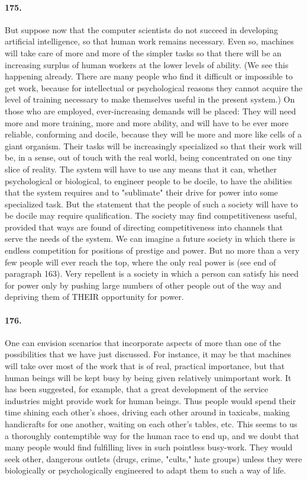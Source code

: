 \documentclass[12pt]{book}
\begin{document}
\paragraph{175.} But suppose now that the computer scientists do not succeed in developing artificial intelligence, so that human work remains necessary.  Even so, machines will take care of more and more of the simpler tasks so that there will be an increasing surplus of human workers at the lower levels of ability. (We see this happening already. There are many people who find it difficult or impossible to get work, because for intellectual or psychological reasons they cannot acquire the level of training necessary to make themselves useful in the present system.) On those who are employed, ever-increasing demands will be placed: They will need more and more training, more and more ability, and will have to be ever more reliable, conforming and docile, because they will be more and more like cells of a giant organism. Their tasks will be increasingly specialized so that their work will be, in a sense, out of touch with the real world, being concentrated on one tiny slice of reality. The system will have to use any means that it can, whether psychological or biological, to engineer people to be docile, to have the abilities that the system requires and to "sublimate" their drive for power into some specialized task. But the statement that the people of such a society will have to be docile may require qualification. The society may find competitiveness useful, provided that ways are found of directing competitiveness into channels that serve the needs of the system. We can imagine a future society in which there is endless competition for positions of prestige and power. But no more than a very few people will ever reach the top, where the only real power is (see end of paragraph 163). Very repellent is a society in which a person can satisfy his need for power only by pushing large numbers of other people out of the way and depriving them of THEIR opportunity for power.


\paragraph{176.} One can envision scenarios that incorporate aspects of more than one of the possibilities that we have just discussed. For instance, it may be that machines will take over most of the work that is of real, practical importance, but that human beings will be kept busy by being given relatively unimportant work. It has been suggested, for example, that a great development of the service industries might provide work for human beings.  Thus people would spend their time shining each other's shoes, driving each other around in taxicabs, making handicrafts for one another, waiting on each other's tables, etc. This seems to us a thoroughly contemptible way for the human race to end up, and we doubt that many people would find fulfilling lives in such pointless busy-work. They would seek other, dangerous outlets (drugs, crime, "cults," hate groups) unless they were biologically or psychologically engineered to adapt them to such a way of life.
\end{document}
